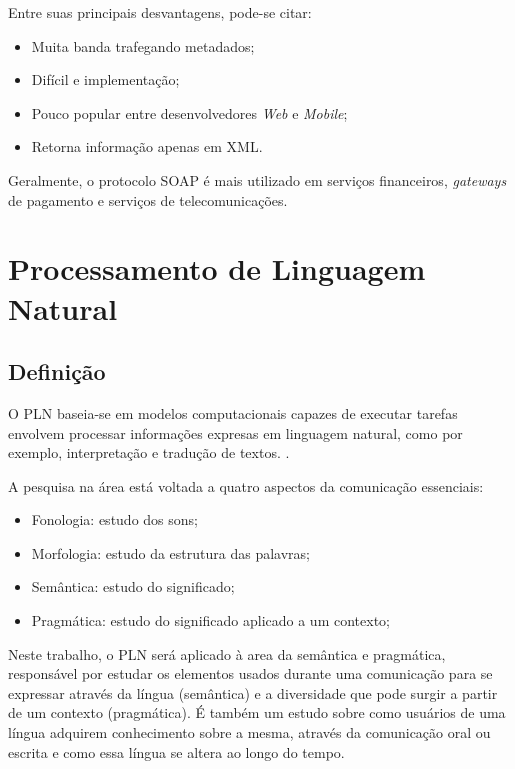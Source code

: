 Entre suas principais desvantagens, pode-se citar:

\begin{itemize}
	\item Muita banda trafegando metadados;
	\item Difícil e implementação;
	\item Pouco popular entre desenvolvedores \textit{Web} e \textit{Mobile};
	\item Retorna informação apenas em XML.
\end{itemize}

Geralmente, o protocolo SOAP é mais utilizado em serviços financeiros, \textit{gateways} de pagamento e serviços de telecomunicações.

\section{Processamento de Linguagem Natural}\label{sec:pnl}

\subsection{Definição}

O \ac{PLN} baseia-se em modelos computacionais capazes de executar tarefas envolvem processar informações expresas em linguagem natural, como por exemplo, interpretação e tradução de textos. \cite{covington1994natural}.

A pesquisa na área está voltada a quatro aspectos da comunicação essenciais:

\begin{itemize}
	\item Fonologia: estudo dos sons;
	\item Morfologia: estudo da estrutura das palavras;
	\item Semântica: estudo do significado;
	\item Pragmática: estudo do significado aplicado a um contexto;
\end{itemize}

Neste trabalho, o PLN será aplicado à area da semântica e pragmática, responsável por estudar os elementos usados durante uma comunicação para se expressar através da língua (semântica) e a diversidade que pode surgir a partir de um contexto (pragmática). É também um estudo sobre como usuários de uma língua adquirem conhecimento sobre a mesma, através da comunicação oral ou escrita e como essa língua se altera ao longo do tempo.

